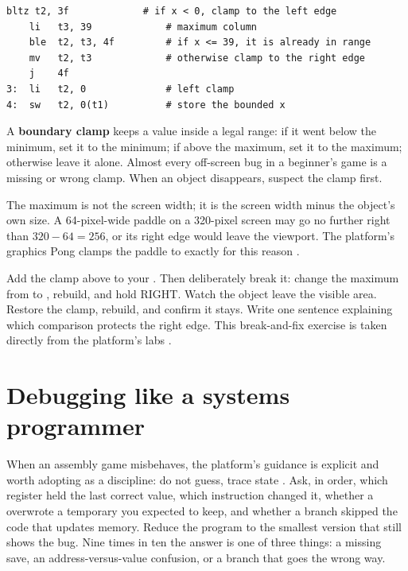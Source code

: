 \begin{lstlisting}[style=asm,caption={Clamping x to the range [0, 39]. Negative values snap to 0; values past the edge snap to the maximum.}]
    bltz t2, 3f             # if x < 0, clamp to the left edge
    li   t3, 39             # maximum column
    ble  t2, t3, 4f         # if x <= 39, it is already in range
    mv   t2, t3             # otherwise clamp to the right edge
    j    4f
3:  li   t2, 0              # left clamp
4:  sw   t2, 0(t1)          # store the bounded x
\end{lstlisting}

\begin{prgconcept}
A \textbf{boundary clamp} keeps a value inside a legal range: if it went below the
minimum, set it to the minimum; if above the maximum, set it to the maximum;
otherwise leave it alone. Almost every off-screen bug in a beginner's game is a
missing or wrong clamp. When an object disappears, suspect the clamp first.
\end{prgconcept}

\begin{prgwarn}
The maximum is not the screen width; it is the screen width minus the object's
own size. A 64-pixel-wide paddle on a 320-pixel screen may go no further right
than $320-64 = 256$, or its right edge would leave the viewport. The platform's
graphics Pong clamps the paddle to exactly  for this reason
\citep{prg32repo}.
\end{prgwarn}

\begin{prgtry}
Add the clamp above to your . Then deliberately break it: change the
maximum from  to , rebuild, and hold RIGHT. Watch the object
leave the visible area. Restore the clamp, rebuild, and confirm it stays. Write
one sentence explaining which comparison protects the right edge. This
break-and-fix exercise is taken directly from the platform's labs
\citep{prg32tutorialgraphic}.
\end{prgtry}

\section{Debugging like a systems programmer}

When an assembly game misbehaves, the platform's guidance is explicit and worth
adopting as a discipline: do not guess, trace state \citep{prg32tutorial}. Ask, in
order, which register held the last correct value, which instruction changed it,
whether a  overwrote a temporary you expected to keep, and whether a
branch skipped the code that updates memory. Reduce the program to the smallest
version that still shows the bug. Nine times in ten the answer is one of three
things: a missing  save, an address-versus-value confusion, or a branch
that goes the wrong way.

